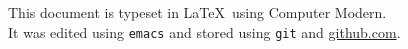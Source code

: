 \documentclass[12pt,oneside]{book}
\begin{document}
\newpage



\newpage



\tableofcontents

\newpage

\listoftables

\listoffigures

\newpage

\begin{pagecentered}

  This document is typeset in \LaTeX\ using Computer Modern.  \\ It
  was edited using \texttt{emacs} and stored using \texttt{git} and
  \url{github.com}.

\end{pagecentered}


\newpage
\setcounter{page}{1}
\hypersetup{pageanchor=true}

\setcounter{chapter}{-1}









\newpage
\label{ch:bib}



\end{document}

